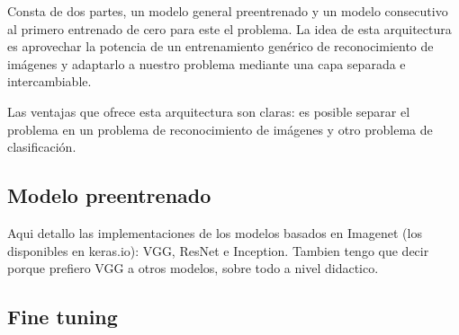 Consta de dos partes, un modelo general preentrenado y un modelo
consecutivo al primero entrenado de cero para este el problema. La idea
de esta arquitectura es aprovechar la potencia de un entrenamiento genérico de
reconocimiento de imágenes y adaptarlo a nuestro problema mediante una capa
separada e intercambiable.

Las ventajas que ofrece esta arquitectura son claras: es posible separar el
problema en un problema de reconocimiento de imágenes y otro problema de
clasificación.

\subsection{Modelo preentrenado}

Aqui detallo las implementaciones de los modelos basados en Imagenet (los
disponibles en keras.io): VGG, ResNet e Inception. Tambien tengo que decir
porque prefiero VGG a otros modelos, sobre todo a nivel didactico.

\subsection{Fine tuning}

